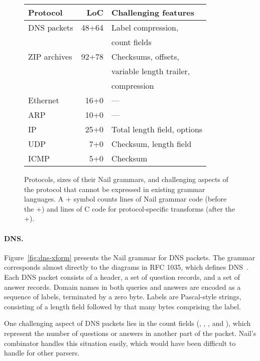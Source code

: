 \begin{figure}[tb]
\centering
\begin{tabular}{lrl}
\toprule
\textbf{Protocol} & \textbf{LoC} & \textbf{Challenging features} \\ 
\midrule
DNS packets & 48+64 & Label compression,\\
  & & count fields \\
ZIP archives & 92+78 & Checksums, offsets, \\ 
  & & variable length trailer, \\
  & & compression \\
Ethernet  & 16+0\phantom{0} & --- \\
ARP       & 10+0\phantom{0} & --- \\
IP        & 25+0\phantom{0} & Total length field, options \\
UDP       &  7+0\phantom{0} & Checksum, length field \\
ICMP      &  5+0\phantom{0} & Checksum \\
\bottomrule
\end{tabular}

\caption{Protocols, sizes of their Nail grammars, and challenging aspects
of the protocol that cannot be expressed in existing grammar languages.
A + symbol counts lines of Nail grammar code (before the +) and lines of
C code for protocol-specific transforms (after the +).}
\label{fig:eval-protocols}
\end{figure}

\paragraph{DNS.}

Figure~\ref{fig:dns-xform} presents the Nail grammar for DNS packets.
The grammar corresponds almost directly to the diagrams in RFC 1035,
which defines DNS~\cite[\S4]{RFC:1035}.  Each DNS packet consists of a
header, a set of question records, and a set of answer records. Domain
names in both queries and answers are encoded as a sequence of labels,
terminated by a zero byte.  Labels are Pascal-style strings, consisting
of a length field followed by that many bytes comprising the label.

One challenging aspect of DNS packets lies in the count fields (,
, , and ), which represent the number of questions
or answers in another part of the packet.  Nail's  combinator
handles this situation easily, which would have been difficult to handle
for other parsers.


